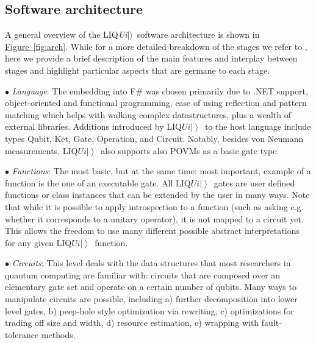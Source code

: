 \documentclass[conference]{IEEEtran}
\newcommand{\fig}[1]{\hyperref[fig:#1]{Figure~\ref*{fig:#1}}}
\newcommand{\ket}[1]{\left| #1\right\rangle}        %
\newcommand{\Liquid}{LIQ$Ui\ket{}$\ }
\newcommand{\REVS}{{\textsc{Revs}}}
\newcommand{\LIQUID}{{LIQ{\em Ui}$|\rangle$}}
\begin{document}
\subsection{Software architecture}

A general overview of the \LIQUID~software architecture is shown in \fig{arch}. While for a more detailed breakdown of the stages we refer to \cite{WS:2014}, here we provide a brief description of the main features and interplay between stages and highlight  particular aspects that are germane to each stage. 

\noindent $\bullet$ {\em Language}: The embedding into F\# was chosen primarily due to .NET support, object-oriented and functional programming, ease of using reflection and pattern matching which helps with walking complex datastructures, plus a wealth of external libraries. Additions introduced by \Liquid to the host language include types {\sc Qubit}, {\sc Ket}, {\sc Gate}, {\sc Operation}, and {\sc Circuit}. Notably, besides von Neumann measurements, \Liquid also supports also POVMs as a basic gate type. 

\noindent $\bullet$ {\em Functions}: The most basic, but at the same time: most important, example of a function is the one of an executable gate. All \Liquid gates are user defined functions or class instances that can be extended by the user in many ways. Note that while it is possible to apply introspection to a function (such as asking e.g. whether it corresponds to a unitary operator), it is not mapped to a circuit yet. This allows the freedom to use many different possible abstract interpretations for any given \Liquid function.%

\noindent $\bullet$ {\em Circuits}: This level deals with the data structures that most researchers in quantum computing are familiar with: circuits that are composed over an elementary gate set and operate on a certain number of qubits. Many ways to manipulate circuits are possible, including a) further decomposition into lower level gates, b) peep-hole style optimization via rewriting, c) optimizations for trading off size and width, d) resource estimation, e) wrapping with fault-tolerance methods. 
\end{document}
